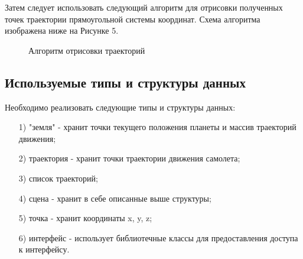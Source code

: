 \documentclass[14pt, a4paper]{extarticle}
\begin{document}
	Затем следует использовать следующий алгоритм для отрисовки полученных точек траектории прямоугольной системы координат. Схема алгоритма изображена ниже на Рисунке 5.
	
	\begin{figure}[h!]
		\caption{Алгоритм отрисовки траекторий}
	\end{figure}		
	\clearpage
	
	
	\subsection{Используемые типы и структуры данных}
	Необходимо реализовать следующие типы и структуры данных:
	\begin{itemize}
		\item[1)] "земля" - хранит точки текущего положения планеты и массив траекторий движения;
		\item[2)] траектория - хранит точки траектории движения самолета;
		\item[3)] список траекторий;
		\item[4)] сцена - хранит в себе описанные выше структуры;
		\item[5)] точка - хранит координаты x, y, z;
		\item[6)] интерфейс - использует библиотечные классы для предоставления доступа к интерфейсу.
		
	\end{itemize}
	
\end{document}

